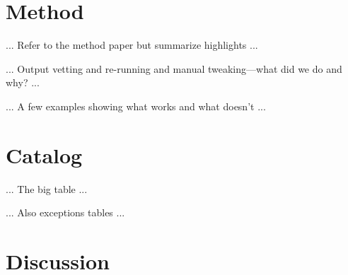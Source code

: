 \documentclass[12pt,preprint,dvipdf]{aastex}
\begin{document}
\section{Method}

... Refer to the method paper but summarize highlights ...

... Output vetting and re-running and manual tweaking---what did we do and why? ...

... A few examples showing what works and what doesn't ...

\section{Catalog}

... The big table ...

... Also exceptions tables ...

\section{Discussion}
\end{document}
